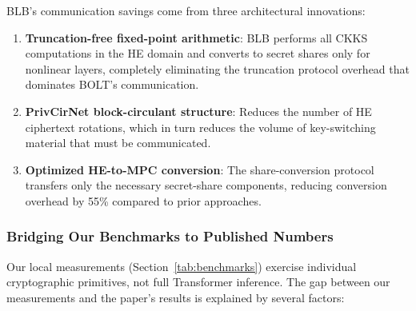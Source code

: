 BLB's communication savings come from three architectural innovations:
\begin{enumerate}[nosep]
  \item \textbf{Truncation-free fixed-point arithmetic}: BLB performs all CKKS computations in the HE domain and converts to secret shares only for nonlinear layers, completely eliminating the truncation protocol overhead that dominates BOLT's communication.
  \item \textbf{PrivCirNet block-circulant structure}: Reduces the number of HE ciphertext rotations, which in turn reduces the volume of key-switching material that must be communicated.
  \item \textbf{Optimized HE-to-MPC conversion}: The share-conversion protocol transfers only the necessary secret-share components, reducing conversion overhead by 55\% compared to prior approaches.
\end{enumerate}

\subsubsection{Bridging Our Benchmarks to Published Numbers}

Our local measurements (Section~\ref{tab:benchmarks}) exercise individual cryptographic primitives, not full Transformer inference.
The gap between our measurements and the paper's results is explained by several factors:

